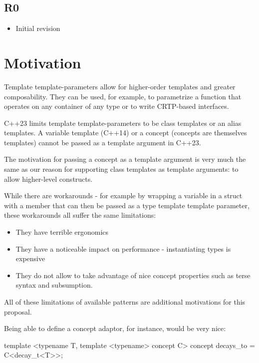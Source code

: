 \documentclass{wg21}
\begin{document}
\subsection{R0}

\begin{itemize}
    \item{Initial revision}
\end{itemize}



\section{Motivation}

Template template-parameters allow for higher-order templates and greater composability.
They can be used, for example, to parametrize a function that operates on any container of any type or to write CRTP-based interfaces.

C++23 limits template template-parameters to be class templates or an alias templates.
A variable template (C++14) or a concept (concepts are themselves templates) cannot be passed as a template argument in C++23.

The motivation for passing a concept as a template argument is very much the same as our reason for supporting class templates as template arguments: to allow higher-level constructs.

While there are workarounds - for example by wrapping a variable in a struct with a  member that can then be passed as a type template template parameter, these workarounds
all suffer the same limitations:

\begin{itemize}
    \item They have terrible ergonomics
    \item They have a noticeable impact on performance - instantiating types is expensive
    \item They do not allow to take advantage of nice concept properties such as terse syntax and subsumption.
\end{itemize}

All of these limitations of available patterns are additional motivations for this proposal.


Being able to define a concept adaptor, for instance, would be very nice:

\begin{colorblock}
template <typename T, template <typename> concept C>
concept decays_to = C<decay_t<T>>;
\end{colorblock}
\end{document}
